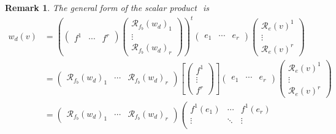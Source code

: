 \documentclass[aps,preprint]{revtex4}
\newtheorem{remark}[theorem]{Remark}
\begin{document}
\begin{remark}
The general form of the scalar product $\label{The general form of the
scalar product}$ is 
\begin{align}
w_{d}\left( v\right) & =\left( \left( 
\begin{array}{ccc}
f^{1} & \cdots & f^{r}%
\end{array}%
\right) \left( 
\begin{array}{c}
\mathcal{R}_{f_{b}}\left( w_{d}\right) _{1} \\ 
\vdots \\ 
\mathcal{R}_{f_{b}}\left( w_{d}\right) _{r}%
\end{array}%
\right) \right) ^{t}\left( 
\begin{array}{ccc}
e_{1} & \cdots & e_{r}%
\end{array}%
\right) \left( 
\begin{array}{c}
\mathcal{R}_{e}\left( v\right) ^{1} \\ 
\vdots \\ 
\mathcal{R}_{e}\left( v\right) ^{r}%
\end{array}%
\right) \\
& =\left( 
\begin{array}{ccc}
\mathcal{R}_{f_{b}}\left( w_{d}\right) _{1} & \cdots & \mathcal{R}%
_{f_{b}}\left( w_{d}\right) _{r}%
\end{array}%
\right) \left[ \left( 
\begin{array}{c}
f^{1} \\ 
\vdots \\ 
f^{r}%
\end{array}%
\right) \right] \left( 
\begin{array}{ccc}
e_{1} & \cdots & e_{r}%
\end{array}%
\right) \left( 
\begin{array}{c}
\mathcal{R}_{e}\left( v\right) ^{1} \\ 
\vdots \\ 
\mathcal{R}_{e}\left( v\right) ^{r}%
\end{array}%
\right) \\
& =\left( 
\begin{array}{ccc}
\mathcal{R}_{f_{b}}\left( w_{d}\right) _{1} & \cdots & \mathcal{R}%
_{f_{b}}\left( w_{d}\right) _{r}%
\end{array}%
\right) \left( 
\begin{array}{ccc}
f^{1}\left( e_{1}\right) & \cdots & f^{1}\left( e_{r}\right) \\ 
\vdots & \ddots & \vdots \\ 

\end{array}
\end{align}
\end{remark}
\end{document}
